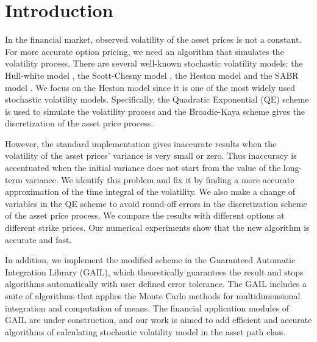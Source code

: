 \documentclass{ws-ijfe}
\begin{document}

\section{Introduction}

In the financial market, observed volatility of the asset prices is not a constant. For more accurate option pricing, we need an algorithm that simulates the volatility process. There are several well-known stochastic volatility models: the Hull-white model \cite{HullWhite1987}, the Scott-Chesny model \cite{ScottChesney1989}, the Heston model \cite{Heston1993} and the SABR model \cite{SABR2002}. We focus on the Heston model since it is one of the most widely used stochastic volatility models. Specifically, the Quadratic Exponential (QE) scheme is used to simulate the volatility process and the Broadie-Kaya scheme gives the discretization of the asset price process.

However, the standard implementation gives inaccurate results when the volatility of the asset prices' variance is very small or zero. Thus inaccuracy is accentuated when the initial variance does not start from the value of the long-term variance. We identify this problem and fix it by finding a more accurate approximation of the time integral of the volatility. We also make a change of variables in the QE scheme to avoid round-off errors in the discretization scheme of the asset price process. We compare the results with different options at different strike prices. Our numerical experiments show that the new algorithm is accurate and fast. %

In addition, we implement the modified scheme in the Guaranteed Automatic Integration Library (GAIL), which theoretically guarantees the result and stops algorithms automatically with user defined error tolerance. The GAIL includes a suite of algorithms that applies the Monte Carlo methods for multidimensional integration and computation of means. The financial application modules of GAIL are under construction, and our work is aimed to add efficient and accurate algorithms of calculating stochastic volatility model in the asset path class.
\end{document}
